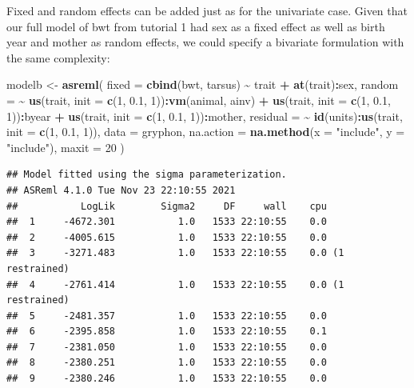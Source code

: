 \documentclass[
  12pt,
]{book}
\newenvironment{Shaded}{\begin{snugshade}}{\end{snugshade}}
\newcommand{\DataTypeTok}[1]{\textcolor[rgb]{0.13,0.29,0.53}{#1}}
\newcommand{\DecValTok}[1]{\textcolor[rgb]{0.00,0.00,0.81}{#1}}
\newcommand{\FloatTok}[1]{\textcolor[rgb]{0.00,0.00,0.81}{#1}}
\newcommand{\KeywordTok}[1]{\textcolor[rgb]{0.13,0.29,0.53}{\textbf{#1}}}
\newcommand{\NormalTok}[1]{#1}
\newcommand{\OperatorTok}[1]{\textcolor[rgb]{0.81,0.36,0.00}{\textbf{#1}}}
\newcommand{\StringTok}[1]{\textcolor[rgb]{0.31,0.60,0.02}{#1}}
\begin{document}
Fixed and random effects can be added just as for the univariate case. Given that our full model of bwt from tutorial 1 had sex as a fixed effect as well as birth year and mother as random effects, we could specify a bivariate formulation with the same complexity:

\begin{Shaded}
\begin{Highlighting}[]
\NormalTok{modelb \textless{}{-}}\StringTok{ }\KeywordTok{asreml}\NormalTok{(}
  \DataTypeTok{fixed =} \KeywordTok{cbind}\NormalTok{(bwt, tarsus) }\OperatorTok{\textasciitilde{}}\StringTok{ }\NormalTok{trait }\OperatorTok{+}\StringTok{ }\KeywordTok{at}\NormalTok{(trait)}\OperatorTok{:}\NormalTok{sex,}
  \DataTypeTok{random =} \OperatorTok{\textasciitilde{}}\StringTok{ }\KeywordTok{us}\NormalTok{(trait, }\DataTypeTok{init =} \KeywordTok{c}\NormalTok{(}\DecValTok{1}\NormalTok{, }\FloatTok{0.1}\NormalTok{, }\DecValTok{1}\NormalTok{))}\OperatorTok{:}\KeywordTok{vm}\NormalTok{(animal, ainv) }\OperatorTok{+}
\StringTok{    }\KeywordTok{us}\NormalTok{(trait, }\DataTypeTok{init =} \KeywordTok{c}\NormalTok{(}\DecValTok{1}\NormalTok{, }\FloatTok{0.1}\NormalTok{, }\DecValTok{1}\NormalTok{))}\OperatorTok{:}\NormalTok{byear }\OperatorTok{+}
\StringTok{    }\KeywordTok{us}\NormalTok{(trait, }\DataTypeTok{init =} \KeywordTok{c}\NormalTok{(}\DecValTok{1}\NormalTok{, }\FloatTok{0.1}\NormalTok{, }\DecValTok{1}\NormalTok{))}\OperatorTok{:}\NormalTok{mother,}
  \DataTypeTok{residual =} \OperatorTok{\textasciitilde{}}\StringTok{ }\KeywordTok{id}\NormalTok{(units)}\OperatorTok{:}\KeywordTok{us}\NormalTok{(trait, }\DataTypeTok{init =} \KeywordTok{c}\NormalTok{(}\DecValTok{1}\NormalTok{, }\FloatTok{0.1}\NormalTok{, }\DecValTok{1}\NormalTok{)),}
  \DataTypeTok{data =}\NormalTok{ gryphon,}
  \DataTypeTok{na.action =} \KeywordTok{na.method}\NormalTok{(}\DataTypeTok{x =} \StringTok{"include"}\NormalTok{, }\DataTypeTok{y =} \StringTok{"include"}\NormalTok{),}
  \DataTypeTok{maxit =} \DecValTok{20}
\NormalTok{)}
\end{Highlighting}
\end{Shaded}

\begin{verbatim}
## Model fitted using the sigma parameterization.
## ASReml 4.1.0 Tue Nov 23 22:10:55 2021
##           LogLik        Sigma2     DF     wall    cpu
##  1     -4672.301           1.0   1533 22:10:55    0.0
##  2     -4005.615           1.0   1533 22:10:55    0.0
##  3     -3271.483           1.0   1533 22:10:55    0.0 (1 restrained)
##  4     -2761.414           1.0   1533 22:10:55    0.0 (1 restrained)
##  5     -2481.357           1.0   1533 22:10:55    0.0
##  6     -2395.858           1.0   1533 22:10:55    0.1
##  7     -2381.050           1.0   1533 22:10:55    0.0
##  8     -2380.251           1.0   1533 22:10:55    0.0
##  9     -2380.246           1.0   1533 22:10:55    0.0
\end{verbatim}
\end{document}
